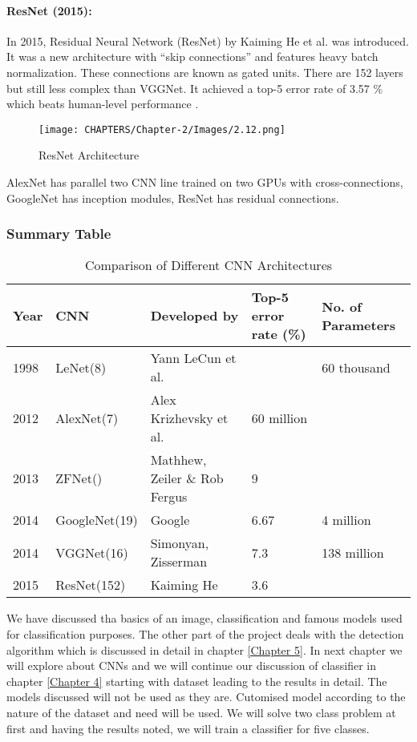 \paragraph*{ResNet (2015):}
In 2015, Residual Neural Network (ResNet) by Kaiming He et al. was introduced. It was a new
architecture with “skip connections” and features heavy batch normalization. These connections are known as gated units. There are 152 layers but still less complex than VGGNet. It achieved a top-5 
error rate of 3.57 \% which beats human-level performance \cite{chap_2_article:14}. 

\begin{figure}[H]
	\centering
	\captionsetup{justification=centering,margin=2cm}
	\texttt{[image: CHAPTERS/Chapter-2/Images/2.12.png]}
	\caption{ResNet Architecture}
	\label{fig:2.11}
\end{figure}

AlexNet has parallel two CNN line trained on two GPUs with cross-connections, GoogleNet has 
inception modules, ResNet has residual connections.

\subsubsection*{Summary Table}
\begin{table}[H]
	\caption{Comparison of Different CNN Architectures}
	  \begin{center}
		\scalebox{.85}
		{\begin{tabular}{|l |l |l |l |l |}
		\hline
		Year & CNN & Developed by & Top-5 error rate (\%) & No. of Parameters \\ \hline
		1998  & LeNet(8) & Yann LeCun et al. &  &  60 thousand 
		\\ \hline
		2012  & AlexNet(7) & Alex Krizhevsky et al. & 60 million &
		\\ \hline
		2013   & ZFNet() &  Mathhew, Zeiler \& Rob Fergus & 9 &
		\\ \hline %
		2014 & GoogleNet(19) & Google & 6.67  & 4 million
		\\ \hline
		2014 & VGGNet(16) & Simonyan, Zisserman & 7.3 & 138 million
		\\ \hline
		2015 & ResNet(152)& Kaiming He & 3.6 & 
		\\ \hline   
		\end{tabular}}
	  \end{center}
\end{table}

We have discussed tha basics of an image, classification and famous models used
for classification purposes. The other part of the project deals with
the detection algorithm which is discussed in detail in chapter \ref{Chapter 5}.
In next chapter we will explore about CNNs and we will continue our discussion
of classifier in chapter \ref{Chapter 4} starting with dataset leading to the
results in detail. The models discussed will not be used as they are. 
Cutomised model according to the nature of the dataset and need will be used.
We will solve two class problem at first and having the results noted, 
we will train a classifier for five classes.

